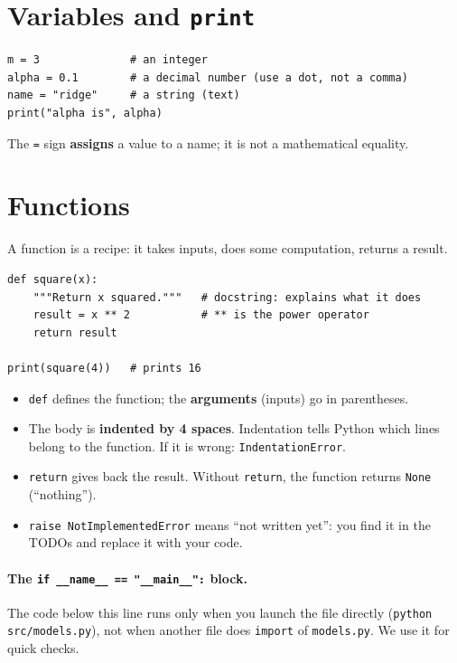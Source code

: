 \documentclass[11pt,a4paper]{article}
\begin{document}
\section{Variables and \texttt{print}}
\begin{lstlisting}
m = 3              # an integer
alpha = 0.1        # a decimal number (use a dot, not a comma)
name = "ridge"     # a string (text)
print("alpha is", alpha)
\end{lstlisting}
The \texttt{=} sign \textbf{assigns} a value to a name; it is not a mathematical equality.

\section{Functions}
A function is a recipe: it takes inputs, does some computation, returns a result.
\begin{lstlisting}
def square(x):
    """Return x squared."""   # docstring: explains what it does
    result = x ** 2           # ** is the power operator
    return result

print(square(4))   # prints 16
\end{lstlisting}
\begin{itemize}
  \item \texttt{def} defines the function; the \textbf{arguments} (inputs) go in parentheses.
  \item The body is \textbf{indented by 4 spaces}. Indentation tells Python which lines belong to the function.
        If it is wrong: \texttt{IndentationError}.
  \item \texttt{return} gives back the result. Without \texttt{return}, the function returns \texttt{None} (``nothing'').
  \item \texttt{raise NotImplementedError} means ``not written yet'': you find it in the TODOs and replace it with your code.
\end{itemize}

\paragraph{The \texttt{if \_\_name\_\_ == "\_\_main\_\_":} block.}
The code below this line runs only when you launch the file directly (\texttt{python src/models.py}),
not when another file does \texttt{import} of \texttt{models.py}. We use it for quick checks.
\end{document}
